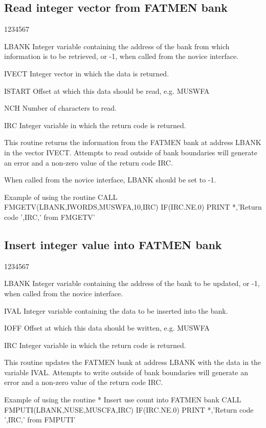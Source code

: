 \subsection{Read integer vector from FATMEN bank}
\begin{DLtt}{1234567}
\item[LBANK]
Integer variable containing the address of the bank from which
information is to be retrieved, or -1, when called from
the novice interface.
\item[IVECT]
Integer vector in which the data is returned.
\item[ISTART]
Offset at which this data should be read, e.g. MUSWFA
\item[NCH]
Number of characters to read.
\item[IRC]
Integer variable in which the return code is returned.
\end{DLtt}
\par
This routine returns the information from
the FATMEN bank at address LBANK
in the vector IVECT. Attempts to read outside of
bank boundaries will generate an error and a non-zero value of the
return code IRC.
\par
When called from the novice interface, LBANK should be set to -1.
\begin{XMPt} {Example of using the \protect{} routine}
      CALL FMGETV(LBANK,IWORDS,MUSWFA,10,IRC)
      IF(IRC.NE.0) PRINT *,'Return code ',IRC,' from FMGETV'
\end{XMPt}
\subsection{Insert integer value into FATMEN bank}
\begin{DLtt}{1234567}
\item[LBANK]
Integer variable containing the address of the bank to be updated,
or -1, when called from
the novice interface.
\item[IVAL]
Integer variable containing the data to be inserted into the bank.
\item[IOFF]
Offset at which this data should be written, e.g. MUSWFA
\item[IRC]
Integer variable in which the return code is returned.
\end{DLtt}
\par
This routine updates the FATMEN bank at address LBANK with the
data in the variable IVAL. Attempts to write outside of
bank boundaries will generate an error and a non-zero value of the
return code IRC.
\begin{XMPt} {Example of using the \protect{} routine}
*     Insert use count into FATMEN bank
      CALL FMPUTI(LBANK,NUSE,MUSCFA,IRC)
      IF(IRC.NE.0) PRINT *,'Return code ',IRC,' from FMPUTI'
\end{XMPt}
